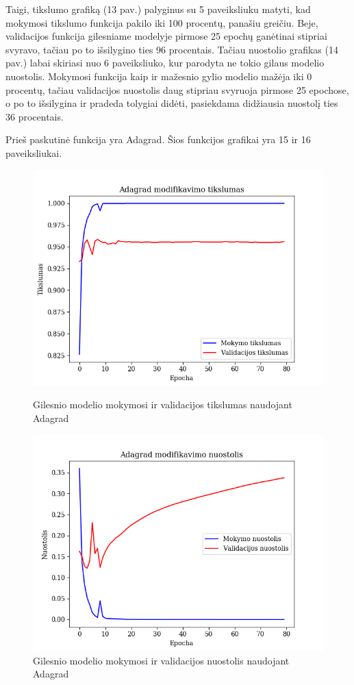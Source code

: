 \documentclass{VUMIFPSkursinis}
\begin{document}
Taigi, tikslumo grafiką (13 pav.) palyginus su 5 paveiksliuku matyti, kad mokymosi tikslumo funkcija pakilo iki 100 procentų, panašiu greičiu. Beje, validacijos funkcija gilesniame modelyje pirmose 25 epochų ganėtinai 
stipriai svyravo, tačiau po to išsilygino ties 96 procentais. 
Tačiau nuostolio grafikas (14 pav.) labai skiriasi nuo 6 paveiksliuko, kur parodyta ne tokio gilaus modelio nuostolis. Mokymosi funkcija kaip ir mažesnio gylio modelio mažėja iki 0 procentų, tačiau validacijos nuostolis 
daug stipriau svyruoja pirmose 25 epochose, o po to išsilygina ir pradeda tolygiai didėti, pasiekdama didžiausia nuostolį ties 36 procentais.

Prieš paskutinė funkcija yra Adagrad. Šios funkcijos grafikai yra 15 ir 16 paveiksliukai.

\begin{figure}[!htbp]
  \centering
  \begin{minipage}[b]{0.49\textwidth}
    \includegraphics[width=\textwidth]{img/AL/Adagrad_acc.png}
    \caption{Gilesnio modelio mokymosi ir validacijos tikslumas naudojant Adagrad}
  \end{minipage}
  \begin{minipage}[b]{0.49\textwidth}
    \includegraphics[width=\textwidth]{img/AL/Adagrad_loss.png}
    \caption{Gilesnio modelio mokymosi ir validacijos nuostolis naudojant Adagrad}
  \end{minipage}
\end{figure}
\end{document}
